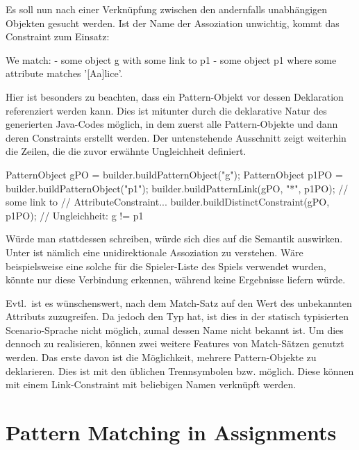 Es soll nun nach einer Verknüpfung zwischen den andernfalls unabhängigen Objekten gesucht werden.
Ist der Name der Assoziation unwichtig, kommt das Constraint  zum Einsatz:

\begin{mdcodeblock}
    We match:
    - some object g with some link to p1
    - some object p1 where some attribute matches '[Aa]lice'.
\end{mdcodeblock}

Hier ist besonders zu beachten, dass ein Pattern-Objekt vor dessen Deklaration referenziert werden kann.
Dies ist mitunter durch die deklarative Natur des generierten Java-Codes möglich,
in dem zuerst alle Pattern-Objekte und dann deren Constraints erstellt werden.
Der untenstehende Ausschnitt zeigt weiterhin die Zeilen, die die zuvor erwähnte Ungleichheit definiert.

\begin{jcodeblock}
    PatternObject gPO = builder.buildPatternObject("g");
    PatternObject p1PO = builder.buildPatternObject("p1");
    builder.buildPatternLink(gPO, "*", p1PO); // some link to
    // AttributeConstraint...
    builder.buildDistinctConstraint(gPO, p1PO); // Ungleichheit: g != p1
\end{jcodeblock}

Würde man stattdessen  schreiben,
würde sich dies auf die Semantik auswirken.
Unter  ist nämlich eine unidirektionale Assoziation zu verstehen.
Wäre beispielsweise eine solche für die Spieler-Liste des Spiels verwendet wurden,
könnte nur  diese Verbindung erkennen,
während  keine Ergebnisse liefern würde.


Evtl.\ ist es wünschenswert, nach dem Match-Satz auf den Wert des unbekannten Attributs zuzugreifen.
Da jedoch  den Typ  hat, ist dies in der statisch typisierten Scenario-Sprache nicht möglich, zumal dessen Name nicht bekannt ist.
Um dies dennoch zu realisieren, können zwei weitere Features von Match-Sätzen genutzt werden.
Das erste davon ist die Möglichkeit, mehrere Pattern-Objekte zu deklarieren.
Dies ist mit den üblichen Trennsymbolen  bzw. \code{,} möglich.
Diese können mit einem Link-Constraint mit beliebigen Namen verknüpft werden.



\section{Pattern Matching in Assignments}\label{sec:assignment-pattern-matching}
